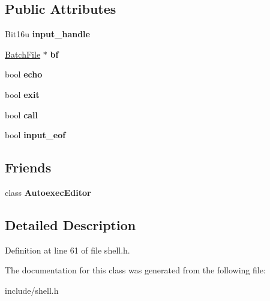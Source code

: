 \subsection*{Public Attributes}
\begin{DoxyCompactItemize}
\item 
\hypertarget{classDOS__Shell_ae7e99ec60f0525ac0b2824e2ae020fa2}{Bit16u {\bfseries input\-\_\-handle}}\label{classDOS__Shell_ae7e99ec60f0525ac0b2824e2ae020fa2}

\item 
\hypertarget{classDOS__Shell_a812e2fbcc49d3523e5939235c1784a8f}{\hyperlink{classBatchFile}{Batch\-File} $\ast$ {\bfseries bf}}\label{classDOS__Shell_a812e2fbcc49d3523e5939235c1784a8f}

\item 
\hypertarget{classDOS__Shell_ab4ee052352ed1dedccf0854bcacadac2}{bool {\bfseries echo}}\label{classDOS__Shell_ab4ee052352ed1dedccf0854bcacadac2}

\item 
\hypertarget{classDOS__Shell_ad687b7ce53d445c65c56891acd4aa660}{bool {\bfseries exit}}\label{classDOS__Shell_ad687b7ce53d445c65c56891acd4aa660}

\item 
\hypertarget{classDOS__Shell_a97d3128aca26624607d9e3acd183cfae}{bool {\bfseries call}}\label{classDOS__Shell_a97d3128aca26624607d9e3acd183cfae}

\item 
\hypertarget{classDOS__Shell_afe355c7cf53320fef3c696ee73d4de47}{bool {\bfseries input\-\_\-eof}}\label{classDOS__Shell_afe355c7cf53320fef3c696ee73d4de47}

\end{DoxyCompactItemize}
\subsection*{Friends}
\begin{DoxyCompactItemize}
\item 
\hypertarget{classDOS__Shell_abca6adc7a2081b5b03c267fdae1d0b8d}{class {\bfseries Autoexec\-Editor}}\label{classDOS__Shell_abca6adc7a2081b5b03c267fdae1d0b8d}

\end{DoxyCompactItemize}


\subsection{Detailed Description}


Definition at line 61 of file shell.\-h.



The documentation for this class was generated from the following file\-:\begin{DoxyCompactItemize}
\item 
include/shell.\-h\end{DoxyCompactItemize}
